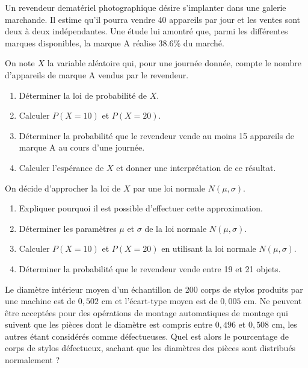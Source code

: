 \def\level{BTS}  %
\def\course{CIEL 2}
\def\chaptername{Lois continues} %
\def\docpart{Loi normale~--~TP2} %
\def\docname{C227}        %

\pagestyle{cours_FP}
\makeheaderBTS{} %

\begin{exercice_cours}[\quad]{}

Un revendeur dematériel photographique désire s’implanter dans une galerie marchande. 
Il estime qu’il pourra vendre 40 appareils par jour et les ventes sont deux à deux indépendantes.
Une étude lui amontré que, parmi les différentes marques disponibles, la marque A réalise $38.6\%$
du marché.

On note $X$ la variable aléatoire qui, pour une journée donnée, compte le nombre d’appareils de marque A vendus par le revendeur.

\begin{enumerate}
	\item Déterminer la loi de probabilité de $X$.
	\item Calculer $P(X=10)$ et $P(X=20)$.
	\item Déterminer la probabilité que le revendeur vende au moins 15 appareils de marque A au cours d’une journée.
	\item Calculer l’espérance de $X$ et donner une interprétation de ce résultat.
\end{enumerate}

On décide d'approcher la loi de $X$ par une loi normale $N(\mu, \sigma)$.

\begin{enumerate}
	\item Expliquer pourquoi il est possible d'effectuer cette approximation.
	\item Déterminer les paramètres $\mu$ et $\sigma$ de la loi normale $N(\mu, \sigma)$.
	\item Calculer $P(X=10)$ et $P(X=20)$ en utilisant la loi normale $N(\mu, \sigma)$.
	\item Déterminer la probabilité que le revendeur vende entre 19 et 21 objets.
\end{enumerate}
\end{exercice_cours}

	\begin{exercice_cours}[\quad]{}

Le diamètre intérieur moyen d'un échantillon de 200 corps de stylos produits par une machine est de $0,502$ cm et l'écart-type
moyen est de $0,005$ cm. Ne peuvent être acceptées pour des opérations de montage automatiques de montage qui suivent que
les pièces dont le diamètre est compris entre $0,496$ et $0,508$ cm, les autres étant considérés comme défectueuses.
Quel est alors le pourcentage de corps de stylos défectueux, sachant que les diamètres des pièces sont distribués normalement ?
\end{exercice_cours}


